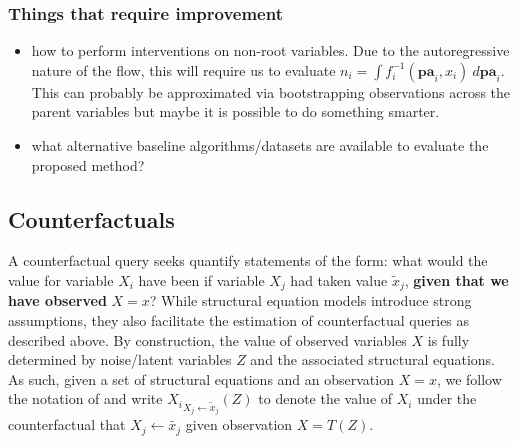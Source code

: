 \documentclass[]{article}
\begin{document}
\subsubsection*{Things that require improvement}
\begin{itemize}
	\item how to perform interventions on non-root variables. Due to the autoregressive nature of the 
	flow, this will require us to evaluate $n_i = \int f_i^{-1}( \mathbf{pa}_i, x_i) ~ d\mathbf{pa}_i$. This can 
	probably be approximated via bootstrapping observations across the parent variables but maybe 
	it is possible to do something smarter. 
	\item what alternative baseline algorithms/datasets are available to evaluate the proposed method?
\end{itemize}


\newpage

\subsection*{Counterfactuals} 

A counterfactual query seeks 
quantify statements of the form: what would the value for variable $X_i$ have been if variable $X_j$ had taken 
value $\tilde x_j$, \textbf{given that we have observed} $X=x$? 
While 
structural equation models introduce strong assumptions, they also 
facilitate the 
estimation of counterfactual queries as described above. 
By construction, the value of observed variables 
$X$ is fully determined by noise/latent variables $Z$ and the associated structural equations. 
As such, given a set of structural equations and an observation $X=x$, 
we follow the notation of \cite{Pearl2009} and write 
${X_i}_{X_j \leftarrow \tilde x_j}(Z)$
to denote the 
value of $X_i$ under the counterfactual that $X_j\leftarrow \tilde{x_j}$ given observation $X= T(Z)$. 


\end{document}
